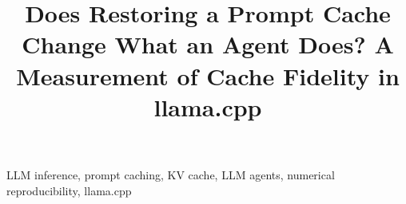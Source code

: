 \documentclass[10pt,conference]{IEEEtran}
\newif\ifanonymous
\begin{document}
\title{Does Restoring a Prompt Cache Change What an Agent Does? A Measurement of Cache Fidelity in llama.cpp}

\ifanonymous
\author{\IEEEauthorblockN{Anonymous Author(s)}}
\else
\author{
}
\fi

\maketitle



\begin{IEEEkeywords}
LLM inference, prompt caching, KV cache, LLM agents, numerical reproducibility, llama.cpp
\end{IEEEkeywords}










\appendix




\clearpage
\label{startofrefs}


\end{document}
